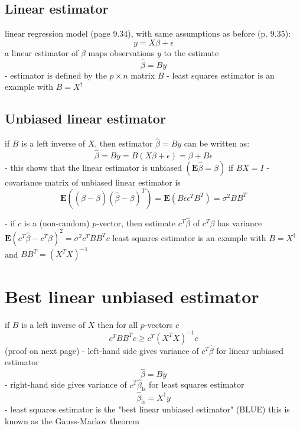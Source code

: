\subsection{Linear estimator}

linear regression model (page 9.34), with same assumptions as before (p. 9.35):
$$
y=X \beta+\epsilon
$$
a linear estimator of $ \beta $ maps observations $ y $ to the estimate
$$
\hat{\beta}=B y
$$
- estimator is defined by the $ p \times n $ matrix $ B $
- least squares estimator is an example with $ B=X^{\dagger} $

\subsection{Unbiased linear estimator}

if $ B $ is a left inverse of $ X $, then estimator $ \hat{\beta}=B y $ can be written as:
$$
\hat{\beta}=B y=B(X \beta+\epsilon)=\beta+B \epsilon
$$
- this shows that the linear estimator is unbiased $ (\mathbf{E} \hat{\beta}=\beta) $ if $ B X=I $
- covariance matrix of unbiased linear estimator is
$$
\mathbf{E}\left((\hat{\beta}-\beta)(\hat{\beta}-\beta)^{T}\right)=\mathbf{E}\left(B \epsilon \epsilon^{T} B^{T}\right)=\sigma^{2} B B^{T}
$$

- if $ c $ is a (non-random) $ p $-vector, then estimate $ c^{T} \hat{\beta} $ of $ c^{T} \beta $ has variance
$ \mathbf{E}\left(c^{T} \hat{\beta}-c^{T} \beta\right)^{2}=\sigma^{2} c^{T} B B^{T} c $
least squares estimator is an example with $ B=X^{\dagger} $ and $ B B^{T}=\left(X^{T} X\right)^{-1} $

\section{Best linear unbiased estimator}

if $ B $ is a left inverse of $ X $ then for all $ p $-vectors $ c $
$$
c^{T} B B^{T} c \geq c^{T}\left(X^{T} X\right)^{-1} c
$$
(proof on next page)
- left-hand side gives variance of $ c^{T} \hat{\beta} $ for linear unbiased estimator
$$
\hat{\beta}=B y
$$
- right-hand side gives variance of $ c^{T} \hat{\beta}_{\mathrm{ls}} $ for least squares estimator
$$
\hat{\beta}_{\mathrm{ls}}=X^{\dagger} y
$$
- least squares estimator is the "best linear unbiased estimator" (BLUE)
this is known as the Gauss-Markov theorem

